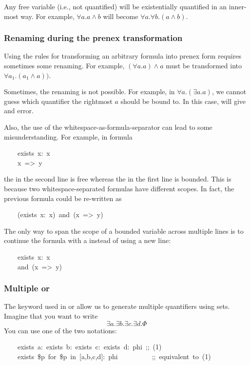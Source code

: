 {\noindent Any free variable (i.e., not quantified) will be existentially quantified
in an inner-most way. For example, $\forall a. a \wedge b$ will become
$\forall a. \forall b. (a \wedge b)$.%

\subsubsection{Renaming during the prenex transformation}\label{sec-renaming-during-the-prenex-transformation}%

\noindent Using the rules for transforming an arbitrary formula into prenex form
requires sometimes some renaming. For example, $(\forall a. a) \wedge a$
must be transformed into $\forall a_1. (a_1 \wedge a))$.%

Sometimes, the renaming is not possible. For example, in
$\forall a. (\exists a. a)$, we cannot guess which quantifier the
rightmost $a$ should be bound to. In this case,  will give and
error.%

Also, the use of the whitespace-as-formula-separator can lead to some
misunderstanding. For example, in formula%
\begin{mdpre}%
\noindent~~~~{exists}~x:~x\\
~~~~x~=\textgreater{}~y%
\end{mdpre}\noindent the  in the second line is free whereas the  in the first line
is bounded. This is because two whitespace-separated formulas have
different scopes. In fact, the previous formula could be re-written as
\begin{mdpre}%
\noindent~~~~({exists}~x:~x)~and~(x~=\textgreater{}~y)%
\end{mdpre}\noindent The only way to span the scope of a bounded variable across multiple lines
is to continue the formula with a  instead of using a new line:
\begin{mdpre}%
\noindent~~~~{exists}~x:~x\\
~~~~and~(x~=\textgreater{}~y)%
\end{mdpre}
\subsubsection{Multiple  or }\label{sec-multiple-exists-or-forall}%

\noindent The keyword  used in  or  allow us to generate
multiple quantifiers using sets. Imagine that you want to write%
\noindent\noindent\[\exists a. \exists b. \exists c. \exists d. \Phi
\]%
\noindent You can use one of the two notations:
\begin{mdpre}%
\noindent~~~~{exists}~a:~{exists}~b:~{exists}~c:~{exists}~d:~phi~{;;~(1)}\\
~~~~{exists}~{\$p}~{for}~{\$p}~{in}~{}[a,b,c,d]:~phi~~~~~~~~~~{;;~equivalent~to~(1)}%
\end{mdpre}
}
